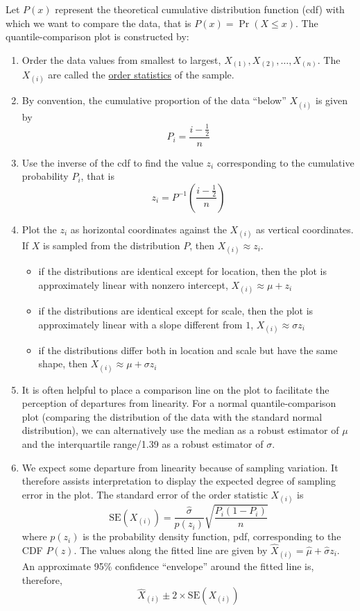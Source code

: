 Let $P(x)$ represent the theoretical cumulative distribution function (cdf) with which we want to compare the data, that is $P(x) = \Pr(X \le x)$.
The quantile-comparison plot is constructed by:
\begin{enumerate}
  \item Order the data values from smallest to largest, $X_{(1)}, X_{(2)}, \dots, X_{(n)}$.  The $X_{(i)}$ are called the \underline{order statistics} of the sample.
  \item By convention, the cumulative proportion of the data ``below'' $X_{(i)}$ is given by 
  $$
  P_i = \frac{i - \frac{1}{2}}{n}
  $$
  \item  Use the inverse of the cdf to find the value $z_i$ corresponding to the cumulative probability $P_i$, that is
  $$
  z_i = P^{-1}(\frac{i - \frac{1}{2}}{n})
  $$
  \item Plot the $z_i$ as horizontal coordinates against the $X_{(i)}$ as vertical coordinates.  If $X$ is sampled from the distribution $P$, then $X_{(i)}\approx z_i$.
  \begin{itemize}
    \item if the distributions are identical except for location, then the plot is approximately linear with nonzero intercept, $X_{(i)} \approx \mu + z_i$
    \item if the distributions are identical except for scale, then the plot is approximately linear with a slope different from $1$, $X_{(i)} \approx \sigma z_i$
    \item if the distributions differ both in location and scale but have the same shape, then $X_{(i)} \approx \mu + \sigma z_i$
  \end{itemize}
  \item It is often helpful to place a comparison line on the plot to facilitate the perception of departures from linearity.  
  For a normal quantile-comparison plot (comparing the distribution of the data with the standard normal distribution), we can alternatively use the median as a robust estimator of $\mu$ and the interquartile range/1.39 as a robust estimator of $\sigma$.
  \item We expect some departure from linearity because of sampling variation.
  It therefore assists interpretation to display the expected degree of sampling error in the plot.
  The standard error of the order statistic $X_{(i)}$ is 
  $$
  \mbox{SE}(X_{(i)}) = \frac{\hat{\sigma}}{p(z_i)} \sqrt{\frac{P_i(1 - P_i)}{n}}
  $$
  where $p(z_i)$ is the probability density function, pdf, corresponding to the CDF $P(z)$.
  The values along the fitted line are given by $\hat{X}_{(i)} = \hat{\mu} + \hat{\sigma}z_i$.
  An approximate 95\% confidence ``envelope'' around the fitted line is, therefore,
  $$
  \hat{X}_{(i)} \pm 2\times \mbox{SE}(X_{(i)}) 
  $$
\end{enumerate}

